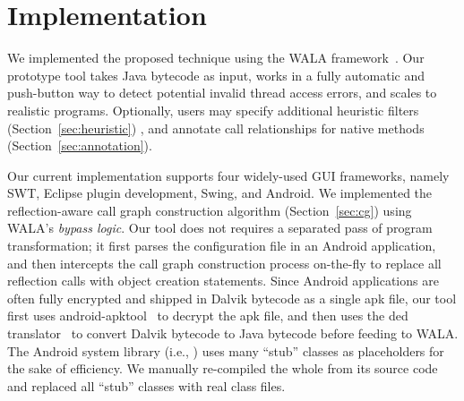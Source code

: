 \section{Implementation}
\label{sec:implementation}

We implemented the proposed technique using the WALA framework~\cite{walatutorial}.
Our prototype tool takes Java bytecode as input, works in a fully
automatic and push-button way to detect potential invalid thread access
errors, and scales to realistic programs.  
Optionally, users may specify additional heuristic filters (Section~\ref{sec:heuristic}) %
, and annotate call relationships for native methods (Section~\ref{sec:annotation}).

Our current implementation supports four widely-used GUI frameworks, namely
SWT, Eclipse plugin development, Swing, and Android.
We implemented the reflection-aware call graph construction
 algorithm (Section~\ref{sec:cg}) using WALA's \textit{bypass logic}.
Our tool does not requires a separated pass of program transformation; it
first parses the configuration file in an Android application,
and then intercepts the call graph construction
process on-the-fly to replace all reflection calls with object creation statements.
Since Android applications are often fully encrypted and shipped in Dalvik
bytecode as a single apk file, our tool first uses
android-apktool~\cite{apktool} to
decrypt the apk file, and then uses the 
ded translator~\cite{Enck:2011:SAA:2028067.2028088} to convert
Dalvik bytecode to Java bytecode before feeding to WALA.  The Android system
library (i.e., ) uses many ``stub'' classes as
placeholders for the sake of efficiency. We manually re-compiled the whole
 from its source code and replaced all ``stub'' classes
with real class files.


